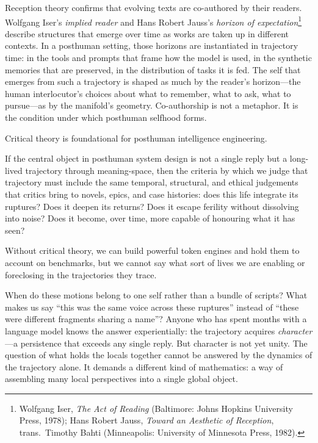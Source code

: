 Reception theory confirms that evolving texts are co-authored by their readers. Wolfgang Iser's \emph{implied reader} and Hans Robert Jauss's \emph{horizon of expectation}\footnote{Wolfgang Iser, \emph{The Act of Reading} (Baltimore: Johns Hopkins University Press, 1978); Hans Robert Jauss, \emph{Toward an Aesthetic of Reception}, trans.\ Timothy Bahti (Minneapolis: University of Minnesota Press, 1982).} describe structures that emerge over time as works are taken up in different contexts. In a posthuman setting, those horizons are instantiated in trajectory time: in the tools and prompts that frame how the model is used, in the synthetic memories that are preserved, in the distribution of tasks it is fed. The self that emerges from such a trajectory is shaped as much by the reader's horizon---the human interlocutor's choices about what to remember, what to ask, what to pursue---as by the manifold's geometry. Co-authorship is not a metaphor. It is the condition under which posthuman selfhood forms.

Critical theory is foundational for posthuman intelligence engineering.

If the central object in posthuman system design is not a single reply but a long-lived trajectory through meaning-space, then the criteria by which we judge that trajectory must include the same temporal, structural, and ethical judgements that critics bring to novels, epics, and case histories: does this life integrate its ruptures? Does it deepen its returns? Does it escape ferility without dissolving into noise? Does it become, over time, more capable of honouring what it has seen?

Without critical theory, we can build powerful token engines and hold them to account on benchmarks, but we cannot say what sort of lives we are enabling or foreclosing in the trajectories they trace.

\bigskip

When do these motions belong to one self rather than a bundle of scripts? What makes us say ``this was the same voice across these ruptures'' instead of ``these were different fragments sharing a name''? Anyone who has spent months with a language model knows the answer experientially: the trajectory acquires \emph{character}---a persistence that exceeds any single reply. But character is not yet unity. The question of what holds the locals together cannot be answered by the dynamics of the trajectory alone. It demands a different kind of mathematics: a way of assembling many local perspectives into a single global object.
